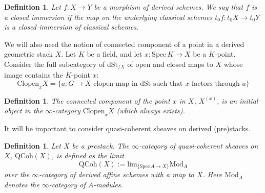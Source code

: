 \documentclass[11pt,letterpaper]{amsart}
\newtheorem{definition}[dummy]{Definition}
\newcommand{\dSt}{\mathrm{dSt}}
\newcommand{\Spec}{\mathrm{S}\mathrm{pec}\,}
\newcommand{\Mod}{\mathrm{Mod}}
\newcommand{\QCoh}{\mathrm{QCoh}}
\begin{document}
\begin{definition}
Let $f:X\rightarrow Y$ be a morphism of derived schemes. We say that $f$ is a \emph{closed immersion} if the map on the underlying classical schemes $t_0 f: t_0 X\rightarrow t_0 Y$ is a closed immersion of classical schemes.
\end{definition}

We will also need the notion of connected component of a point in a derived geometric stack $X$. Let $K$ be a field, and let $x:\Spec K\rightarrow X$ be a $K$-point. Consider the full subcategory of $\dSt_{/X}$ of open and closed maps to $X$ whose image contains the $K$-point $x$:
$$
\mathrm{Clopen}_{x}{X} =\{  a:G\rightarrow X\mbox{ clopen map in }\dSt  \mbox{ such that }x\mbox{ factors through }a\}
$$
\begin{definition}
The connected component of the point $x$ in $X$, $X^{(x)}$, is an initial object in the $\infty$-category $\mathrm{Clopen}_{x}{X}$ (which always exists). 
\end{definition}

It will be important to consider quasi-coherent sheaves on derived (pre)stacks. 
\begin{definition} Let $X$ be a prestack. 
The \emph{$\infty$-category of quasi-coherent sheaves} on $X$, $\QCoh(X)$, is defined as the limit 
$$
\QCoh(X):=\mathrm{lim}_{\{\Spec A\rightarrow X\}}\Mod_A
$$
over the $\infty$-category of derived affine schemes with a map to $X$. Here $\Mod_{A}$ denotes the $\infty$-category of  $A$-modules.
\end{definition}
\end{document}
